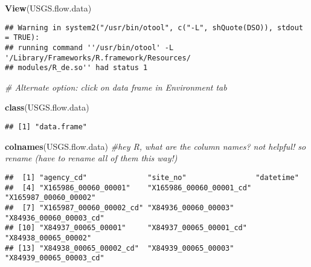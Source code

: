 \documentclass[]{article}
\newenvironment{Shaded}{\begin{snugshade}}{\end{snugshade}}
\newcommand{\CommentTok}[1]{\textcolor[rgb]{0.56,0.35,0.01}{\textit{#1}}}
\newcommand{\KeywordTok}[1]{\textcolor[rgb]{0.13,0.29,0.53}{\textbf{#1}}}
\newcommand{\NormalTok}[1]{#1}
\begin{document}
\begin{Shaded}
\begin{Highlighting}[]
\KeywordTok{View}\NormalTok{(USGS.flow.data)}
\end{Highlighting}
\end{Shaded}

\begin{verbatim}
## Warning in system2("/usr/bin/otool", c("-L", shQuote(DSO)), stdout = TRUE):
## running command ''/usr/bin/otool' -L '/Library/Frameworks/R.framework/Resources/
## modules/R_de.so'' had status 1
\end{verbatim}

\begin{Shaded}
\begin{Highlighting}[]
\CommentTok{# Alternate option: click on data frame in Environment tab}

\KeywordTok{class}\NormalTok{(USGS.flow.data)}
\end{Highlighting}
\end{Shaded}

\begin{verbatim}
## [1] "data.frame"
\end{verbatim}

\begin{Shaded}
\begin{Highlighting}[]
\KeywordTok{colnames}\NormalTok{(USGS.flow.data) }\CommentTok{#hey R, what are the column names? not helpful! so rename (have to rename all of them this way!)}
\end{Highlighting}
\end{Shaded}

\begin{verbatim}
##  [1] "agency_cd"              "site_no"                "datetime"              
##  [4] "X165986_00060_00001"    "X165986_00060_00001_cd" "X165987_00060_00002"   
##  [7] "X165987_00060_00002_cd" "X84936_00060_00003"     "X84936_00060_00003_cd" 
## [10] "X84937_00065_00001"     "X84937_00065_00001_cd"  "X84938_00065_00002"    
## [13] "X84938_00065_00002_cd"  "X84939_00065_00003"     "X84939_00065_00003_cd"
\end{verbatim}
\end{document}
